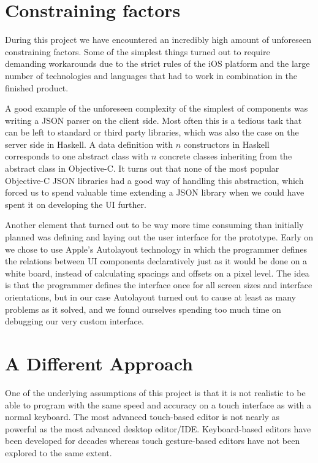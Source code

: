 \section{Constraining factors}
During this project we have encountered an incredibly high amount of unforeseen constraining factors. Some of the simplest things turned out to require demanding workarounds due to the strict rules of the iOS platform and the large number of technologies and languages that had to work in combination in the finished product.

A good example of the unforeseen complexity of the simplest of components was writing a JSON parser on the client side. Most often this is a tedious task that can be left to standard or third party libraries, which was also the case on the server side in Haskell. A data definition with $n$ constructors in Haskell corresponds to one abstract class with $n$ concrete classes inheriting from the abstract class in Objective-C. It turns out that none of the most popular Objective-C JSON libraries had a good way of handling this abstraction, which forced us to spend valuable time extending a JSON library when we could have spent it on developing the UI further.

Another element that turned out to be way more time consuming than initially planned was defining and laying out the user interface for the prototype. Early on we chose to use Apple's Autolayout technology in which the programmer defines the relations between UI components declaratively just as it would be done on a white board, instead of calculating spacings and offsets on a pixel level. The idea is that the programmer defines the interface once for all screen sizes and interface orientations, but in our case Autolayout turned out to cause at least as many problems as it solved, and we found ourselves spending too much time on debugging our very custom interface.

\section{A Different Approach}
One of the underlying assumptions of this project is that it is not realistic to be able to program with the same speed and accuracy on a touch interface as with a normal keyboard. The most advanced touch-based editor is not nearly as powerful as the most advanced desktop editor/IDE\@. Keyboard-based editors have been developed for decades whereas touch gesture-based editors have not been explored to the same extent. 

